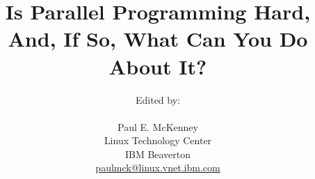 \documentclass[10pt,twocolumn]{book}
\begin{document}
\newcommand{\co}[1]{\lstinline[breaklines=yes,breakatwhitespace=yes]{#1}}

\title{Is Parallel Programming Hard, And, If So, What Can You Do About It?}
\author{
	Edited by: \\
	\\
	Paul E. McKenney \\
	Linux Technology Center \\
	IBM Beaverton \\
	\href{mailto:paulmck@linux.vnet.ibm.com}{paulmck@linux.vnet.ibm.com} \\
} %

\setcounter{topnumber}{3}
\renewcommand\topfraction{.75}
\setcounter{bottomnumber}{2}
\renewcommand\bottomfraction{.3}
\setcounter{totalnumber}{5}
\renewcommand\textfraction{.15}
\renewcommand\floatpagefraction{.5}
\setcounter{dbltopnumber}{3}
\renewcommand\dbltopfraction{.75}
\renewcommand\dblfloatpagefraction{.5}

\setlength{\textheight}{8.25in}
\setlength{\textwidth}{6.5in}
\setlength{\columnsep}{0.25in}

\newcommand{\IfInBook}[2]{\ifthenelse{\boolean{inbook}}{#1}{#2}}
\setcounter{secnumdepth}{3}

\frontmatter

\maketitle

\tableofcontents


\mainmatter


















\appendix



\end{document}
